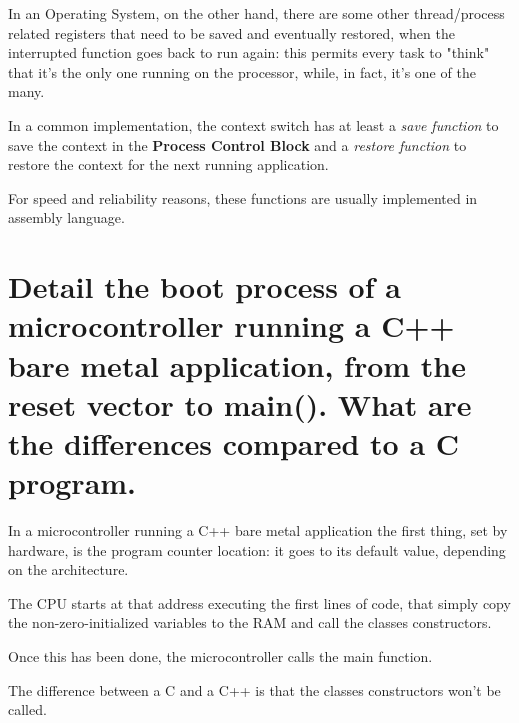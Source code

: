 In an Operating System, on the other hand, there are some other thread/process related registers that need to be saved and eventually restored, when the interrupted function goes back to run again: this permits every task to "think" that it's the only one running on the processor, while, in fact, it's one of the many.

In a common implementation, the context switch has at least a \textit{save function} to save the context in the \textbf{Process Control Block} and a \textit{restore function} to restore the context for the next running application.

For speed and reliability reasons, these functions are usually implemented in assembly language.


\section{Detail the boot process of a microcontroller running a C++ bare metal application, from the reset vector to main(). What are the differences compared to a C program.}

In a microcontroller running a C++ bare metal application the first thing, set by hardware, is the program counter location: it goes to its default value, depending on the architecture.

The CPU starts at that address executing the first lines of code, that simply copy the non-zero-initialized variables to the RAM and call the classes constructors.

Once this has been done, the microcontroller calls the main function.

The difference between a C and a C++ is that the classes constructors won't be called.